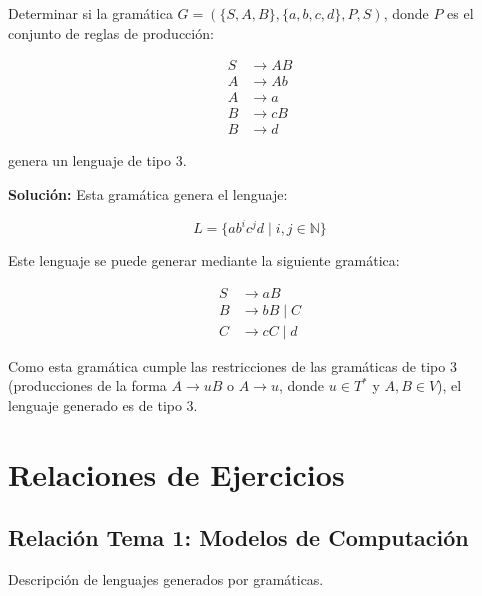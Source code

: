 \documentclass[12pt]{book} %
\begin{document}
\begin{ejercicioresuelto}
Determinar si la gramática \( G = (\{S, A, B\}, \{a, b, c, d\}, P, S) \), donde \( P \) es el conjunto de reglas de producción:

\[
\begin{aligned}
    S &\to AB \\
    A &\to Ab \\
    A &\to a \\
    B &\to cB \\
    B &\to d
\end{aligned}
\]

genera un lenguaje de tipo 3.

\textbf{Solución:} Esta gramática genera el lenguaje:

\[
L = \{ab^i c^j d \mid i, j \in \mathbb{N}\}
\]

Este lenguaje se puede generar mediante la siguiente gramática:

\[
\begin{aligned}
    S &\to aB \\
    B &\to bB \mid C \\
    C &\to cC \mid d
\end{aligned}
\]

Como esta gramática cumple las restricciones de las gramáticas de tipo 3 (producciones de la forma \( A \to uB \) o \( A \to u \), donde \( u \in T^* \) y \( A, B \in V \)), el lenguaje generado es de tipo 3.
\end{ejercicioresuelto}

\chapter{Relaciones de Ejercicios}

\hypertarget{relaciuxf3n-tema-1-modelos-de-computaciuxf3n}{%
\section{Relación Tema 1: Modelos de
Computación}\label{relaciuxf3n-tema-1-modelos-de-computaciuxf3n}}

\begin{ejercicio}
Descripción de lenguajes generados por gramáticas.
\end{ejercicio}
\end{document}
